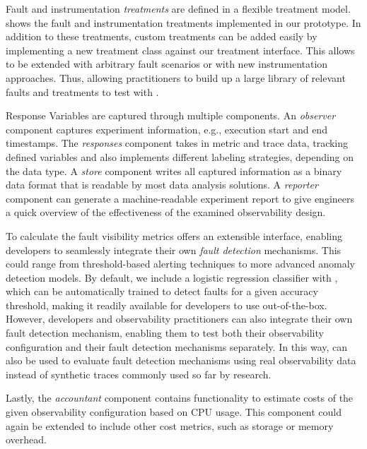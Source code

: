 Fault and instrumentation \textit{treatments} are defined in a flexible treatment model. %
 shows the fault and instrumentation treatments implemented in our prototype. In addition to these treatments, custom treatments can be added easily by implementing a new treatment class against our treatment interface. This allows
\name{} to be extended with arbitrary fault scenarios or with new instrumentation approaches. Thus, allowing practitioners to build up a large library of relevant faults and treatments to test with \name{}.
\begin{table}[t]
    \caption{Different treatments implemented in \textsc{oxn}} \label{table:instrumentation-treatment-library}\label{table:fault-treatment-library}
    \resizebox{\columnwidth}{!}{}
\vspace{-1em}
\end{table}
%
%




Response Variables are captured through multiple components.
An \textit{observer} component captures experiment information, e.g., execution start and end timestamps.
The \textit{responses} component takes in metric and trace data, tracking defined variables and also implements different labeling strategies, depending on the data type.
A \textit{store} component writes all captured information as a binary data format that is readable by most data analysis solutions. 
A \textit{reporter} component can generate a machine-readable experiment report to give engineers a quick overview of the effectiveness of the examined observability design.

To calculate the fault visibility metrics \name{} offers an extensible interface, enabling developers to seamlessly integrate their own \textit{fault detection} mechanisms. This could range from threshold-based alerting techniques to more advanced anomaly detection models.
By default, we include a logistic regression classifier with \name{}, which can be automatically trained to detect faults for a given accuracy threshold, making it readily available for developers to use out-of-the-box. 
However, developers and observability practitioners can also integrate their own fault detection mechanism, enabling them to test both their observability configuration and their fault detection mechanisms separately. 
In this way, \name{} can also be used to evaluate fault detection mechanisms using real observability data instead of synthetic traces commonly used so far by research. 

Lastly, the \textit{accountant} component contains functionality to estimate costs of the given observability configuration based on CPU usage. This component could again be extended to include other cost metrics, such as storage or memory overhead.



